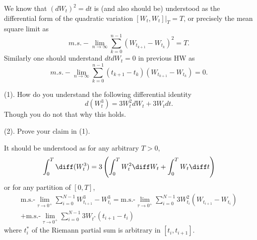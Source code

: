     \problem
    \begin{question}
        We know that $(dW_t)^2=dt$ is (and also should be) understood as the differential form of the quadratic variation $[W_t,W_t]|_T=T$, or precisely the mean square limit as
        \[m.s.-\lim_{n\rightarrow \infty} \sum^{n-1}_{k=0}(W_{t_{k+1}}-W_{t_k})^2=T.\]
        Similarly one should understand $dtdW_t=0$ in previous HW as
        \[m.s.-\lim_{n\rightarrow \infty} \sum^{n-1}_{k=0}(t_{k+1}-t_{k})(W_{t_{k+1}}-W_{t_k})=0.\]

        (1).  How do you understand the following differential identity
        \[d(W_t^3)=3W_t^2dW_t+3W_tdt.\]
        Though you do not that why this holds.

        (2).  Prove your claim in (1).
    \end{question}
    \begin{subproblem}[(\arabic*).]
        \item
        It should be understood as for any arbitrary $T>0$,
        \[\int_0^T\diff(W_t^3)=3\left(\int_0^TW_t^2\diff W_t
        +\int_0^TW_t\diff t\right)\] 
        or for any partition of $[0,T]$,
        \begin{multline*}
            \text{m.s.-}\lim_{\tau\to 0^+}
        \sum_{i=0}^{N-1}
        W_{t_{i+1}}^3-W^3_{t_i}
        =\text{m.s.-}\lim_{\tau\to 0^+}
        \sum_{i=0}^{N-1}
        3W_{t_i}^2(W_{t_{i+1}}-W_{t_i})\\
        +\text{m.s.-}\lim_{\tau\to0^+}
        \sum_{i=0}^{N-1}3W_{t^*}(t_{i+1}-t_i)
        \end{multline*}
        where $t^*_i$ of the Riemann partial sum is arbitrary
        in $[t_i,t_{i+1}]$.


\end{subproblem}
